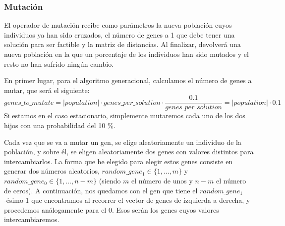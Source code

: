 \documentclass[10pt,a4paper]{article}
\begin{document}
\subsubsection{Mutación}

El operador de mutación recibe como parámetros la nueva población cuyos individuos ya han sido cruzados, el número de genes a 1 que debe tener una solución para ser factible y la matriz de distancias. Al finalizar, devolverá una nueva población en la que un porcentaje de los individuos han sido mutados y el resto no han sufrido ningún cambio.

En primer lugar, para el algoritmo generacional, calculamos el número de genes a mutar, que será el siguiente:
$$genes\_to\_mutate = |population| \cdot genes\_per\_solution \cdot \frac{0.1}{genes\_per\_solution} = |population| \cdot 0.1$$
Si estamos en el caso estacionario, simplemente mutaremos cada uno de los dos hijos con una probabilidad del 10 \%.

Cada vez que se va a mutar un gen, se elige aleatoriamente un individuo de la población, y sobre él, se eligen aleatoriamente dos genes con valores distintos para intercambiarlos. La forma que he elegido para elegir estos genes consiste en generar dos números aleatorios, $random\_gene_1 \in \{1,\dots,m\}$ y $random\_gene_0 \in \{1,\dots,n-m\}$ (siendo $m$ el número de unos y $n-m$ el número de ceros). A continuación, nos quedamos con el gen que tiene el $random\_gene_1$-ésimo 1 que encontramos al recorrer el vector de genes de izquierda a derecha, y procedemos análogamente para el 0. Esos serán los genes cuyos valores intercambiaremos.\\
\end{document}
